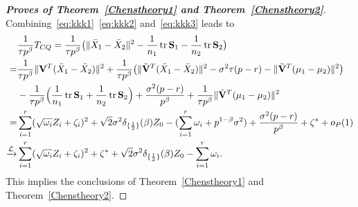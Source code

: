 \documentclass[review]{elsarticle}
\DeclareMathOperator{\mytr}{tr}
\theoremstyle{plain}
\theoremstyle{definition}
\theoremstyle{remark}
\begin{document}
\begin{proof}[\textbf{Proves of Theorem~\ref{Chenstheory1} and Theorem~\ref{Chenstheory2}}]
    Combining~\eqref{eq:kkk1}~\eqref{eq:kkk2} and~\eqref{eq:kkk3} leads to
    $$
    \begin{aligned}
        &\frac{1}{\tau p^{\beta}} T_{CQ}
        =\frac{1}{\tau p^{\beta}}\big(\|\bar{X}_1-\bar{X}_2\|^2-\frac{1}{n_1}\mytr \BS_1-\frac{1}{n_2}\mytr \BS_2\big)\\
        =&
        \frac{1}{\tau p^{\beta}}{\|\BV^T(\bar{X}_1-\bar{X}_2)\|^2}+
        \frac{1}{\tau p^{\beta}} \big({\|\tilde{\BV}^T(\bar{X}_1-\bar{X}_2)\|^2-\sigma^2 \tau(p-r)-\|\tilde{\BV}^T(\mu_1-\mu_2)\|^2}\big)\\
        &-\frac{1}{\tau p^{\beta}}\Big(\frac{1}{n_1}\mytr \BS_1+\frac{1}{n_2}\mytr \BS_2\Big)+\frac{\sigma^2 (p-r)}{p^\beta}+\frac{1}{\tau p^\beta}\|\tilde{\BV}^T(\mu_1-\mu_2)\|^2\\
        =&
        \sum_{i=1}^r (\sqrt{\omega_i} Z_i+\zeta_i)^2+
   \sqrt{2} \sigma^2 \delta_{\{\frac{1}{2}\}}(\beta)Z_0
        -
        (\sum_{i=1}^r \omega_i+p^{1-\beta}\sigma^2)
        +\frac{\sigma^2 (p-r)}{p^\beta}+\zeta^*+o_P(1)\\
        \xrightarrow{\mathcal{L}}&
        \sum_{i=1}^r (\sqrt{\omega_i} Z_i+\zeta_i)^2+
\zeta^*+
    \sqrt{2}\sigma^2 \delta_{\{\frac{1}{2}\}}(\beta)Z_0
        -
        \sum_{i=1}^r \omega_i.
    \end{aligned}
    $$
    This implies the conclusions of Theorem~\ref{Chenstheory1} and Theorem~\ref{Chenstheory2}.

%

\end{proof}
\end{document}
